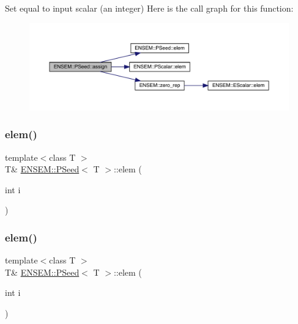 Set equal to input scalar (an integer) Here is the call graph for this function\+:
\nopagebreak
\begin{figure}[H]
\begin{center}
\leavevmode
\includegraphics[width=350pt]{dc/d14/classENSEM_1_1PSeed_a8d74bd21af23dfb165937c3bb546ea8f_cgraph}
\end{center}
\end{figure}
\mbox{\label{classENSEM_1_1PSeed_aeed16139a22df65e16fd064b7808c49a}} 
\subsubsection{\texorpdfstring{elem()}{elem()}\hspace{0.1cm}{\footnotesize\ttfamily [1/6]}}
{\footnotesize\ttfamily template$<$class T $>$ \\
T\& \mbox{\hyperlink{classENSEM_1_1PSeed}{E\+N\+S\+E\+M\+::\+P\+Seed}}$<$ T $>$\+::elem (\begin{DoxyParamCaption}\item[{int}]{i }\end{DoxyParamCaption})\hspace{0.3cm}{\ttfamily [inline]}}

\mbox{\label{classENSEM_1_1PSeed_aeed16139a22df65e16fd064b7808c49a}} 
\subsubsection{\texorpdfstring{elem()}{elem()}\hspace{0.1cm}{\footnotesize\ttfamily [2/6]}}
{\footnotesize\ttfamily template$<$class T $>$ \\
T\& \mbox{\hyperlink{classENSEM_1_1PSeed}{E\+N\+S\+E\+M\+::\+P\+Seed}}$<$ T $>$\+::elem (\begin{DoxyParamCaption}\item[{int}]{i }\end{DoxyParamCaption})\hspace{0.3cm}{\ttfamily [inline]}}

